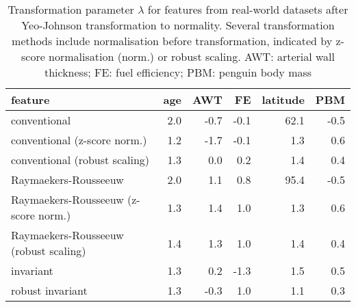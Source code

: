 \documentclass[
  a4paper,
]{article}
\begin{document}
\begin{table}
\begin{center}
\caption{Transformation parameter $\lambda$ for features from real-world datasets after Yeo-Johnson transformation to normality. 
Several transformation methods include normalisation before transformation, indicated by z-score normalisation (norm.) or robust scaling. 
AWT: arterial wall thickness; FE: fuel efficiency; PBM: penguin body mass}
\label{tab:experimental-results-appendix-lambda}
\begin{tabular}{l | r r r r r}

\toprule
feature & age & AWT & FE & latitude & PBM \\

\midrule
conventional                          & 2.0 & -0.7 & -0.1 & 62.1 & -0.5 \\
conventional (z-score norm.)          & 1.2 & -1.7 & -0.1 &  1.3 &  0.6 \\
conventional (robust scaling)         & 1.3 &  0.0 &  0.2 &  1.4 &  0.4 \\
Raymaekers-Rousseeuw                  & 2.0 &  1.1 &  0.8 & 95.4 & -0.5 \\
Raymaekers-Rousseeuw (z-score norm.)  & 1.3 &  1.4 &  1.0 &  1.3 &  0.6 \\
Raymaekers-Rousseeuw (robust scaling) & 1.4 &  1.3 &  1.0 &  1.4 &  0.4 \\
invariant                             & 1.3 &  0.2 & -1.3 &  1.5 &  0.5 \\
robust invariant                      & 1.3 & -0.3 &  1.0 &  1.1 &  0.3 \\
\bottomrule
\end{tabular}
\end{center}
\end{table}
\end{document}
